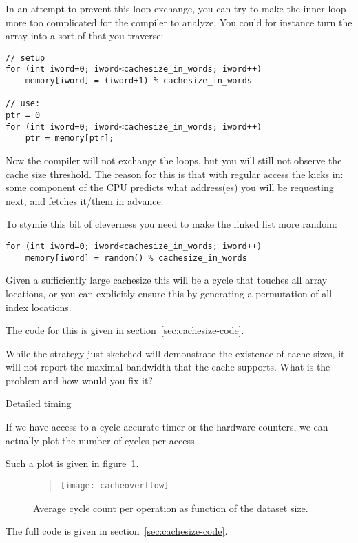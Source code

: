 In an attempt to prevent this loop exchange,
you can try to make the inner loop more too complicated
for the compiler to analyze.
You could for instance turn the array into a sort of 
that you traverse:
\begin{lstlisting}
// setup
for (int iword=0; iword<cachesize_in_words; iword++)
    memory[iword] = (iword+1) % cachesize_in_words

// use:
ptr = 0
for (int iword=0; iword<cachesize_in_words; iword++)
    ptr = memory[ptr];
\end{lstlisting}
Now the compiler will not exchange the loops, but you will still not
observe the cache size threshold.
The reason for this is that with regular access the 
kicks in:
some component of the CPU predicts what address(es) you will be requesting next,
and fetches it/them in advance.

To stymie this bit of cleverness you need to make the linked list more random:
\begin{lstlisting}
for (int iword=0; iword<cachesize_in_words; iword++)
    memory[iword] = random() % cachesize_in_words
\end{lstlisting}
Given a sufficiently large cachesize this will be a cycle
that touches all array locations,
or you can explicitly ensure this by generating a permutation of all index locations.

The code for this is given in section~\ref{sec:cachesize-code}.

\begin{exercise}
  While the strategy just sketched will demonstrate the existence of cache sizes,
  it will not report the maximal bandwidth that the cache supports.
  What is the problem and how would you fix it?
\end{exercise}

 {Detailed timing}

If we have access to a cycle-accurate timer or the hardware counters,
we can actually plot the number of cycles per access.

Such a plot is given in figure~\ref{fig:cache-overflow}.
\begin{figure}[ht]
  \begin{quote}
  \texttt{[image: cacheoverflow]}
  \end{quote}
  \caption{Average cycle count per operation as function of the dataset size.}
  \label{fig:cache-overflow}
\end{figure}
The full code is given in section~\ref{sec:cachesize-code}.

